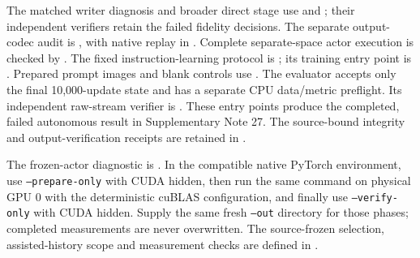 \documentclass[10pt,a4paper]{article}
\begin{document}
The matched writer diagnosis and broader direct stage use
 and
; their independent
verifiers retain the failed fidelity decisions. The separate output-codec
audit is , with native replay in
. Complete separate-space actor
execution is checked by .
The fixed instruction-learning protocol is
; its training entry
point is . Prepared prompt images
and blank controls use .
The evaluator  accepts only the final
10,000-update state and has a separate CPU data/metric preflight. Its
independent raw-stream verifier is .
These entry points produce the completed, failed autonomous result in
Supplementary Note 27. The source-bound integrity and output-verification
receipts are retained in .

The frozen-actor diagnostic is
. In the compatible native
PyTorch environment, use \texttt{--prepare-only} with CUDA hidden, then run
the same command on physical GPU 0 with the deterministic cuBLAS configuration,
and finally use \texttt{--verify-only} with CUDA hidden. Supply the same fresh
\texttt{--out} directory for those phases; completed measurements are never
overwritten. The source-frozen selection, assisted-history scope and
measurement checks are defined in
.


\end{document}
